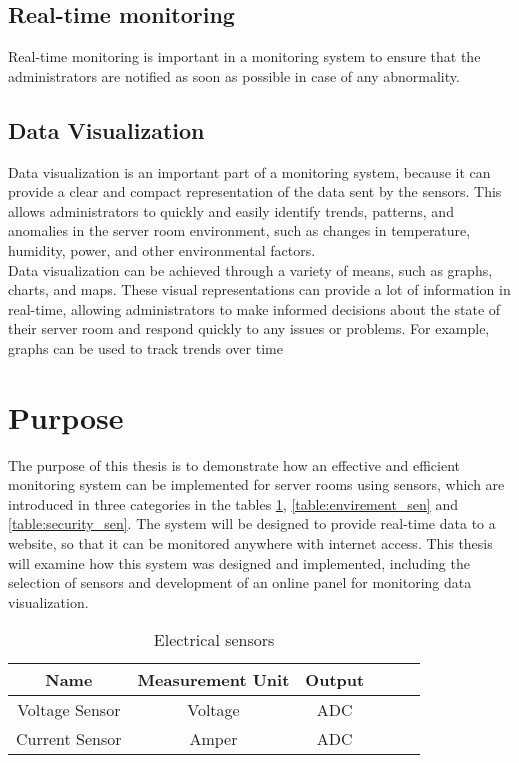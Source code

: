         \subsection{Real-time monitoring}
        Real-time monitoring is important in a monitoring system to ensure that the administrators are notified as soon as possible in case of any abnormality.
        \subsection{Data Visualization}
        Data visualization is an important part of a monitoring system, because it can provide a clear and compact representation of the data sent by the sensors. This allows administrators to quickly and easily identify trends, patterns, and anomalies in the server room environment, such as changes in temperature, humidity, power, and other environmental factors.\\
        Data visualization can be achieved through a variety of means, such as graphs, charts, and maps. These visual representations can provide a lot of information in real-time, allowing administrators to make informed decisions about the state of their server room and respond quickly to any issues or problems. For example, graphs can be used to track trends over time

        \section{Purpose}
            The purpose of this thesis is to demonstrate how an effective and efficient monitoring system can be implemented for server rooms using sensors, which are introduced in three categories in the tables \ref{table:electrical_sensors}, \ref{table:envirement_sen} and \ref{table:security_sen}. The system will be designed to provide real-time data to a website, so that it can be monitored anywhere with internet access. This thesis will examine how this system was designed and implemented, including the selection of sensors and development of an online panel for monitoring data visualization.
            
            \begin{table}
                \centering
                \caption{Electrical sensors}
                \begin{tabular}{ |c|c|c|c|c|c|}
                \hline
                {\textbf{Name}} & {\textbf{Measurement Unit}} & {\textbf{Output}} \\ 
                \hline

                Voltage Sensor & Voltage &  ADC \\
                \hline
                
                Current Sensor & Amper &  ADC \\
                \hline
                \end{tabular}
                \label {table:electrical_sensors}
            \end{table}
               
